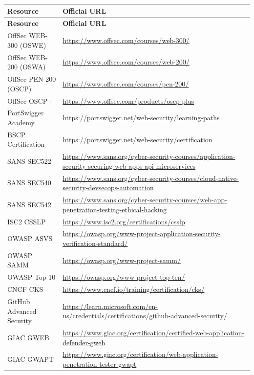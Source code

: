 \documentclass[11pt,letterpaper]{article}
\begin{document}
\begin{longtable}{>{\raggedright\arraybackslash}p{4cm} >{\raggedright\arraybackslash}p{9cm}}
\toprule
\textbf{Resource} & \textbf{Official URL} \\
\midrule
\endfirsthead
\toprule
\textbf{Resource} & \textbf{Official URL} \\
\midrule
\endhead
\bottomrule
\endlastfoot
OffSec WEB-300 (OSWE) & \url{https://www.offsec.com/courses/web-300/} \\
OffSec WEB-200 (OSWA) & \url{https://www.offsec.com/courses/web-200/} \\
OffSec PEN-200 (OSCP) & \url{https://www.offsec.com/courses/pen-200/} \\
OffSec OSCP+ & \url{https://www.offsec.com/products/oscp-plus} \\
PortSwigger Academy & \url{https://portswigger.net/web-security/learning-paths} \\
BSCP Certification & \url{https://portswigger.net/web-security/certification} \\
SANS SEC522 & \url{https://www.sans.org/cyber-security-courses/application-security-securing-web-apps-api-microservices} \\
SANS SEC540 & \url{https://www.sans.org/cyber-security-courses/cloud-native-security-devsecops-automation} \\
SANS SEC542 & \url{https://www.sans.org/cyber-security-courses/web-app-penetration-testing-ethical-hacking} \\
ISC2 CSSLP & \url{https://www.isc2.org/certifications/csslp} \\
OWASP ASVS & \url{https://owasp.org/www-project-application-security-verification-standard/} \\
OWASP SAMM & \url{https://owasp.org/www-project-samm/} \\
OWASP Top 10 & \url{https://owasp.org/www-project-top-ten/} \\
CNCF CKS & \url{https://www.cncf.io/training/certification/cks/} \\
GitHub Advanced Security & \url{https://learn.microsoft.com/en-us/credentials/certifications/github-advanced-security/} \\
GIAC GWEB & \url{https://www.giac.org/certification/certified-web-application-defender-gweb} \\
GIAC GWAPT & \url{https://www.giac.org/certification/web-application-penetration-tester-gwapt} \\
\end{longtable}
\end{document}
